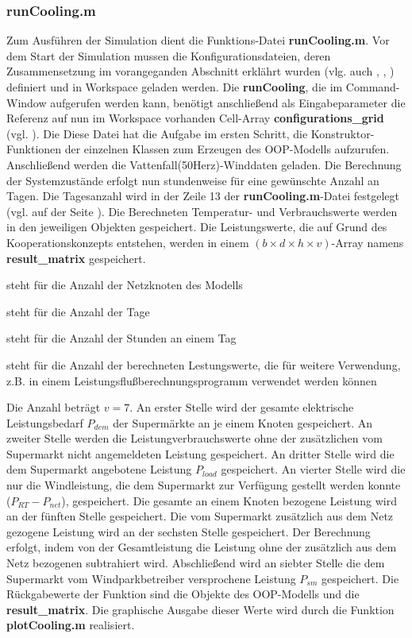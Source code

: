 \subsubsection*{runCooling.m}
Zum Ausf\"uhren der Simulation dient die \matlab Funktions-Datei
\textbf{runCooling.m}. Vor dem Start der Simulation mussen die
Konfigurationsdateien, deren Zusammensetzung im vorangeganden Abschnitt
erkl\"ahrt wurden (vlg. auch , ,
) definiert und in \matlab Workspace geladen werden. Die
\textbf{runCooling}, die im \matlab Command-Window aufgerufen werden kann,
ben\"otigt anschlie\ss end als Eingabeparameter die Referenz auf nun im \matlab
Workspace vorhanden Cell-Array \textbf{configurations\_grid} (vgl.
). Die Diese Datei hat die Aufgabe im ersten Schritt, die
Konstruktor-Funktionen der einzelnen Klassen zum Erzeugen des OOP-Modells
aufzurufen. Anschlie\ss end werden die Vattenfall(50Herz)-Winddaten geladen. Die
Berechnung der Systemzust\"ande erfolgt nun stundenweise f\"ur eine gew\"unschte
Anzahl an Tagen. Die Tagesanzahl wird in der Zeile 13 der
\textbf{runCooling.m}-Datei festgelegt (vgl.  auf der Seite
\pageref{configf}). Die Berechneten Temperatur- und Verbrauchswerte werden in
den jeweiligen Objekten gespeichert. Die Leistungswerte, die auf Grund des
Kooperationskonzepts entstehen, werden in einem $( b \times d \times h \times v
)$-Array namens \textbf{result\_matrix} gespeichert.
\begin{description}[\dth]
\item[$b$] steht f\"ur die Anzahl der Netzknoten des Modells
\item[$d$] steht f\"ur die Anzahl der Tage
\item[$h$] steht f\"ur die Anzahl der Stunden an einem Tag
\item[$v$] steht f\"ur die Anzahl der berechneten Lestungswerte, die f\"ur
weitere Verwendung, z.B. in einem Leistungsflu\ss berechnungsprogramm verwendet
werden k\"onnen
\end{description}
Die Anzahl betr\"agt $v = 7$. An erster Stelle wird der gesamte elektrische
Leistungsbedarf $P_{dem}$ der Superm\"arkte an je einem Knoten gespeichert. An
zweiter Stelle werden die Leistungverbrauchswerte ohne der zus\"atzlichen vom
Supermarkt nicht angemeldeten Leistung gespeichert. An dritter Stelle wird die
dem Supermarkt angebotene Leistung $P_{load}$ gespeichert. An vierter Stelle
wird die nur die Windleistung, die dem Supermarkt zur Verf\"ugung gestellt
werden konnte ($P_{RT} - P_{net}$), gespeichert. Die gesamte an einem Knoten
bezogene Leistung wird an der f\"unften Stelle gespeichert. Die vom
Supermarkt zus\"atzlich aus dem Netz gezogene Leistung wird an der sechsten
Stelle gespeichert. Der Berechnung erfolgt, indem von der Gesamtleistung die
Leistung ohne der zus\"atzlich aus dem Netz bezogenen subtrahiert wird.
Abschlie\ss end wird an siebter Stelle die dem Supermarkt vom Windparkbetreiber
versprochene Leistung $P_{sm}$ gespeichert. Die R\"uckgabewerte der Funktion
sind die Objekte des OOP-Modells und die \textbf{result\_matrix}.
Die graphische Ausgabe dieser Werte wird durch die Funktion
\textbf{plotCooling.m} realisiert.

